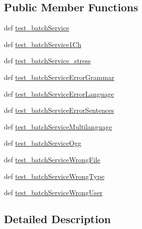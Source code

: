 \subsection*{Public Member Functions}
\begin{DoxyCompactItemize}
\item 
def \hyperlink{classbatch__functional_1_1SpeechDetSphinx4Func_a3c9455a650ec1a3d9a00633a77f8f3f5}{test\-\_\-batch\-Service}
\item 
def \hyperlink{classbatch__functional_1_1SpeechDetSphinx4Func_a316641ac7870ddb63490749b4792b590}{test\-\_\-batch\-Service1\-Ch}
\item 
def \hyperlink{classbatch__functional_1_1SpeechDetSphinx4Func_a4d12d3b504c8fc29e7c9b8e70cfeafeb}{test\-\_\-batch\-Service\-\_\-stress}
\item 
def \hyperlink{classbatch__functional_1_1SpeechDetSphinx4Func_a0c6afe405631c51df8d4a77b1dcb7948}{test\-\_\-batch\-Service\-Error\-Grammar}
\item 
def \hyperlink{classbatch__functional_1_1SpeechDetSphinx4Func_a6f945f6044e7ea87104b09ff78246c92}{test\-\_\-batch\-Service\-Error\-Language}
\item 
def \hyperlink{classbatch__functional_1_1SpeechDetSphinx4Func_addc7e5d430efa25e53a1f8b009fd3b27}{test\-\_\-batch\-Service\-Error\-Sentences}
\item 
def \hyperlink{classbatch__functional_1_1SpeechDetSphinx4Func_a60e1d7080a383403819714762985a711}{test\-\_\-batch\-Service\-Multilanguage}
\item 
def \hyperlink{classbatch__functional_1_1SpeechDetSphinx4Func_aa8ba2178adfc4b21cebbb4a6b5da150d}{test\-\_\-batch\-Service\-Ogg}
\item 
def \hyperlink{classbatch__functional_1_1SpeechDetSphinx4Func_ae2dd4750a0e80ea44031177010853800}{test\-\_\-batch\-Service\-Wrong\-File}
\item 
def \hyperlink{classbatch__functional_1_1SpeechDetSphinx4Func_a5e136352309b7a428b13ad668a4c765c}{test\-\_\-batch\-Service\-Wrong\-Type}
\item 
def \hyperlink{classbatch__functional_1_1SpeechDetSphinx4Func_ae5bbcb5d348b49172f0de8243f0dcb59}{test\-\_\-batch\-Service\-Wrong\-User}
\end{DoxyCompactItemize}


\subsection{Detailed Description}



